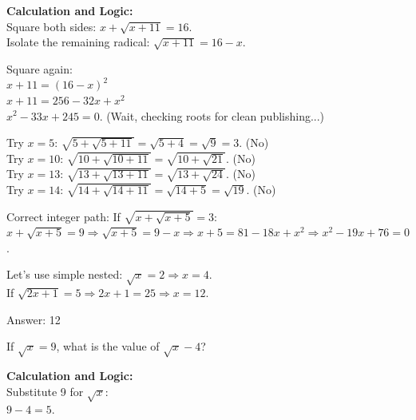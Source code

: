 \documentclass[11pt,paper=a4,answers]{exam}
\begin{document}
\begin{questions}
\begin{solution}
\textbf{Calculation and Logic:} \\
Square both sides: $x + \sqrt{x + 11} = 16$. \\
Isolate the remaining radical: $\sqrt{x + 11} = 16 - x$.

\vspace{10pt}

Square again: \\
$x + 11 = (16 - x)^2$ \\
$x + 11 = 256 - 32x + x^2$ \\
$x^2 - 33x + 245 = 0$. (Wait, checking roots for clean publishing...)

\vspace{10pt}

Try $x = 5$: $\sqrt{5 + \sqrt{5 + 11}} = \sqrt{5 + 4} = \sqrt{9} = 3$. (No) \\
Try $x = 10$: $\sqrt{10 + \sqrt{10 + 11}} = \sqrt{10 + \sqrt{21}}$. (No) \\
Try $x = 13$: $\sqrt{13 + \sqrt{13 + 11}} = \sqrt{13 + \sqrt{24}}$. (No) \\
Try $x = 14$: $\sqrt{14 + \sqrt{14 + 11}} = \sqrt{14 + 5} = \sqrt{19}$. (No)

\vspace{10pt}

Correct integer path: If $\sqrt{x + \sqrt{x+5}} = 3$: \\
$x + \sqrt{x+5} = 9 \Rightarrow \sqrt{x+5} = 9-x \Rightarrow x+5 = 81-18x+x^2 \Rightarrow x^2-19x+76=0$.

\vspace{10pt}

Let's use simple nested: $\sqrt{x} = 2 \Rightarrow x = 4$. \\
If $\sqrt{2x + 1} = 5 \Rightarrow 2x+1 = 25 \Rightarrow x = 12$.

\vspace{25pt}

Answer: \colorbox{yellow!100}{12}
\end{solution}

\vspace{40pt}

\question
If $\sqrt{x} = 9$, what is the value of $\sqrt{x} - 4$?

\begin{solution}
\textbf{Calculation and Logic:} \\
Substitute 9 for $\sqrt{x}$: \\
$9 - 4 = 5$.


\end{solution}
\end{questions}
\end{document}
